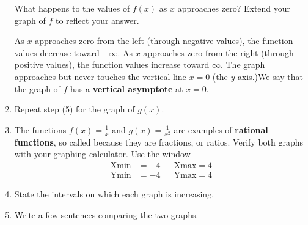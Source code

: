\documentclass[10pt,]{book}
\newcommand{\terminology}[1]{\textbf{#1}}
\theoremstyle{plain}
\theoremstyle{definition}
\theoremstyle{definition}
\theoremstyle{definition}
\theoremstyle{definition}
\theoremstyle{definition}
\numberwithin{equation}{section}
\newcommand{\hrulethin}  {\noalign{\hrule height 0.04em}}
\newcommand{\hrulethick} {\noalign{\hrule height 0.11em}}
\newcounter{figstack}
\newcounter{figindex}
\newlength\fight
\newcommand\pushValignCaptionBottom[5][b]{%
\stepcounter{figstack}%
\expandafter\def\csname %
figalign\romannumeral\value{figstack}\endcsname{#1}%
\expandafter\def\csname %
figtype\romannumeral\value{figstack}\endcsname{#2}%
\expandafter\def\csname %
figwd\romannumeral\value{figstack}\endcsname{#3}%
\expandafter\def\csname %
figcontent\romannumeral\value{figstack}\endcsname{#4}%
\expandafter\def\csname %
figcap\romannumeral\value{figstack}\endcsname{#5}%
\setbox0=\hbox{%
\begin{#2}{#3}#4\end{#2}}%
\ifdim\dimexpr\ht0+\dp0\relax>\fight\global\setlength{\fight}{%
\dimexpr\ht0+\dp0\relax}\fi%
}
\newcommand\popValignCaptionBottom{%
\setcounter{figindex}{0}%
\hfill%
\whiledo{\value{figindex}<\value{figstack}}{%
\stepcounter{figindex}%
\def\tmp{\csname figwd\romannumeral\value{figindex}\endcsname}%
\begin{\csname figtype\romannumeral\value{figindex}\endcsname}[t]{\tmp}%
\centering%
\stackinset{c}{}%
{\csname figalign\romannumeral\value{figindex}\endcsname}{}%
{\csname figcontent\romannumeral\value{figindex}\endcsname}%
{\rule{0pt}{\fight}}\par%
\csname figcap\romannumeral\value{figindex}\endcsname%
\end{\csname figtype\romannumeral\value{figindex}\endcsname}%
\hfill%
}%
\setcounter{figstack}{0}%
\setlength{\fight}{0pt}%
\hfill%
}
\newcommand{\amp}{ & }
\begin{document}
\begin{enumerate}
    \leavevmode%
What happens to the values of \(f (x)\) as \(x\) approaches zero? Extend your graph of \(f\) to reflect your answer.%
\par
As \(x\) approaches zero from the left (through negative values), the function values decrease toward \(-\infty\). As \(x\) approaches zero from the right (through positive values), the function values increase toward \(\infty\). The graph approaches but never touches the vertical line \(x = 0\) (the \(y\)-axis.)We say that the graph of \(f\) has a \terminology{vertical asymptote} at \(x = 0\).%
\item\hypertarget{li-272}{}
        Repeat step (5) for the graph of \(g(x)\).
    \item\hypertarget{li-273}{}
        The functions \(f (x) = \frac{1}{x}\) and \(g(x) = \frac{1}{x^2}\) are examples of \terminology{rational functions}, so called because they are fractions, or ratios. Verify both graphs with your graphing calculator. Use the window
        \begin{align}
        \text{Xmin} \amp = −4 \amp\amp \text{Xmax} = 4\\
        \text{Ymin} \amp = −4 \amp\amp \text{Ymax} = 4
        \end{align}
    \item\hypertarget{li-274}{}
        State the intervals on which each graph is increasing.
    \item\hypertarget{li-275}{}
        Write a few sentences comparing the two graphs.
    \end{enumerate}
\end{document}
